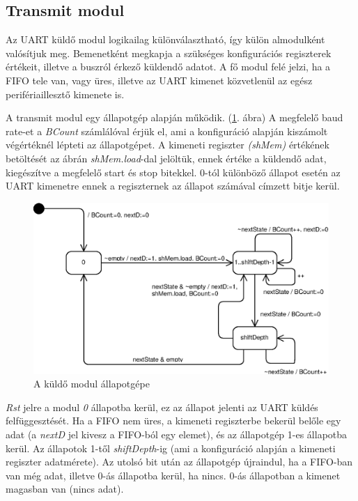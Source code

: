 \subsection{Transmit modul}
Az UART küldő modul logikailag különválasztható, így külön almodulként valósítjuk meg. Bemenetként megkapja a szükséges konfigurációs regiszterek értékeit, illetve a buszról érkező küldendő adatot. A fő modul felé jelzi, ha a FIFO tele van, vagy üres, illetve az UART kimenet közvetlenül az egész perifériaillesztő kimenete is.

A transmit modul egy állapotgép alapján működik. (\ref{fig:tx_state}. ábra) A megfelelő baud rate-et a \textit{BCount} számlálóval érjük el, ami a konfiguráció alapján kiszámolt végértéknél lépteti az állapotgépet. A kimeneti regiszter \textit{(shMem)} értékének betöltését az ábrán \textit{shMem.load}-dal jelöltük, ennek értéke a küldendő adat, kiegészítve a megfelelő start és stop bitekkel. 0-tól különböző állapot esetén az UART kimenetre ennek a regiszternek az állapot számával címzett bitje kerül.

\begin{figure}[h]
\vspace{0.5cm}
\begin{center}
\includegraphics{figures/tx_state.eps}
\caption{A küldő modul állapotgépe}
\label{fig:tx_state}
\end{center}
\vspace{0.5cm}
\end{figure}

\textit{Rst} jelre a modul \textit{0} állapotba kerül, ez az állapot jelenti az UART küldés felfüggesztését. Ha a FIFO nem üres, a kimeneti regiszterbe bekerül belőle egy adat (a \textit{nextD} jel kivesz a FIFO-ból egy elemet), és az állapotgép 1-es állapotba kerül. Az állapotok 1-től \textit{shiftDepth}-ig (ami a konfiguráció alapján a kimeneti regiszter adatmérete). Az utolsó bit után az állapotgép újraindul, ha a FIFO-ban van még adat, illetve 0-ás állapotba kerül, ha nincs. 0-ás állapotban a kimenet magasban van (nincs adat).

